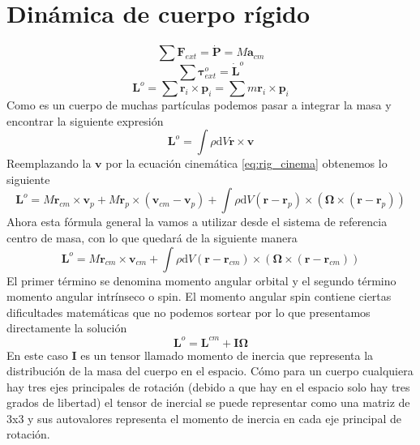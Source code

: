 \documentclass[a4paper]{article}
\numberwithin{equation}{section}
\begin{document}
\section{Dinámica de cuerpo rígido}
	\begin{equation}
		\sum \boldsymbol{F}_{ext} = \dot{\boldsymbol{P}} = M \boldsymbol{a}_{cm} \label{eq:newton_rig}
	\end{equation}
	\begin{equation}
		\sum \boldsymbol{\tau}^{o}_{ext} = \dot{\boldsymbol{L}}^{o} \label{eq:newton_rig_rot}
	\end{equation}
	\begin{equation*}
		\boldsymbol{L}^{o} = \sum \boldsymbol{r}_{i} \times \boldsymbol{p}_i = \sum m \boldsymbol{r}_i \times \boldsymbol{p}_i
	\end{equation*}
	Como es un cuerpo de muchas partículas podemos pasar a integrar la masa y encontrar la siguiente expresión
	\begin{equation*}
		\boldsymbol{L}^{o} = \int \rho \mathrm{d}V \boldsymbol{r} \times \boldsymbol{v}
	\end{equation*}
	Reemplazando la $\boldsymbol{v}$ por la ecuación cinemática \ref{eq:rig_cinema} obtenemos lo siguiente
	\begin{equation}
		\boldsymbol{L}^{o} = M \boldsymbol{r}_{cm} \times \boldsymbol{v}_{p} + M \boldsymbol{r}_{p} \times (\boldsymbol{v}_{cm} - \boldsymbol{v}_p) + \int \rho \mathrm{d}V (\boldsymbol{r} - \boldsymbol{r}_p) \times (\boldsymbol{\Omega} \times (\boldsymbol{r} - \boldsymbol{r}_p))
	\end{equation}
	Ahora esta fórmula general la vamos a utilizar desde el sistema de referencia centro de masa, con lo que quedará de la siguiente manera
	\begin{equation}
		\boldsymbol{L}^{o} = M \boldsymbol{r}_{cm} \times \boldsymbol{v}_{cm} + \int \rho \mathrm{d}V (\boldsymbol{r} - \boldsymbol{r}_{cm}) \times (\boldsymbol{\Omega} \times (\boldsymbol{r} - \boldsymbol{r}_{cm}))
	\end{equation}
	El primer término se denomina momento angular orbital y el segundo término momento angular intrínseco o spin. El momento angular spin contiene ciertas dificultades matemáticas que no podemos sortear por lo que presentamos directamente la solución
	\begin{equation}
		\boldsymbol{L}^{o} = \boldsymbol{L}^{cm} + \boldsymbol{I} \boldsymbol{\Omega} 
	\end{equation}
	En este caso $\boldsymbol{I}$ es un tensor llamado momento de inercia que representa la distribución de la masa del cuerpo en el espacio. Cómo para un cuerpo cualquiera hay tres ejes principales de rotación (debido a que hay en el espacio solo hay tres grados de libertad) el tensor de inercial se puede representar como una matriz de 3x3 y sus autovalores representa el momento de inercia en cada eje principal de rotación.\\
\end{document}

